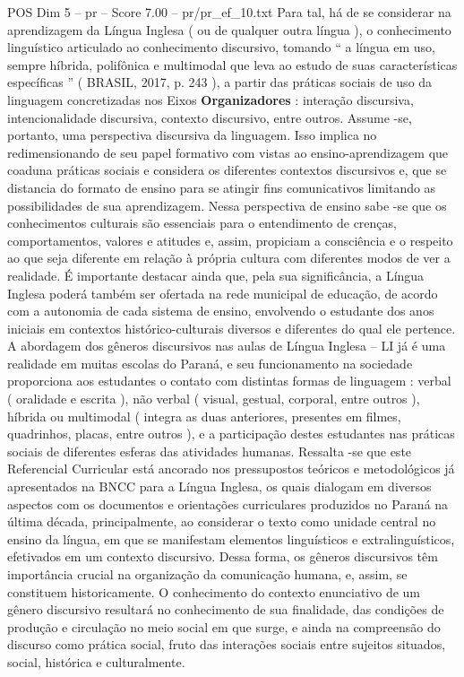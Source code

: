 \begin{textsample}{POS Dim 5 – pr – Score 7.00 – pr/pr\_ef\_10.txt}
Para tal, há de se considerar na aprendizagem da Língua Inglesa ( ou de qualquer outra língua ), o conhecimento linguístico articulado ao conhecimento discursivo, tomando “ a língua em uso, sempre híbrida, polifônica e multimodal que leva ao estudo de suas características específicas ” ( BRASIL, 2017, p. 243 ), a partir das práticas sociais de uso da linguagem concretizadas nos Eixos \textbf{Organizadores} : interação discursiva, intencionalidade discursiva, contexto discursivo, entre outros.
Assume -se, portanto, uma perspectiva discursiva da linguagem.
Isso implica no redimensionando de seu papel formativo com vistas ao ensino-aprendizagem que coaduna práticas sociais e considera os diferentes contextos discursivos e, que se distancia do formato de ensino para se atingir fins comunicativos limitando as possibilidades de sua aprendizagem.
Nessa perspectiva de ensino sabe -se que os conhecimentos culturais são essenciais para o entendimento de crenças, comportamentos, valores e atitudes e, assim, propiciam a consciência e o respeito ao que seja diferente em relação à própria cultura com diferentes modos de ver a realidade.
É importante destacar ainda que, pela sua significância, a Língua Inglesa poderá também ser ofertada na rede municipal de educação, de acordo com a autonomia de cada sistema de ensino, envolvendo o estudante dos anos iniciais em contextos histórico-culturais diversos e diferentes do qual ele pertence.
A abordagem dos gêneros discursivos nas aulas de Língua Inglesa – LI já é uma realidade em muitas escolas do Paraná, e seu funcionamento na sociedade proporciona aos estudantes o contato com distintas formas de linguagem : verbal ( oralidade e escrita ), não verbal ( visual, gestual, corporal, entre outros ), híbrida ou multimodal ( integra as duas anteriores, presentes em filmes, quadrinhos, placas, entre outros ), e a participação destes estudantes nas práticas sociais de diferentes esferas das atividades humanas.
Ressalta -se que este Referencial Curricular está ancorado nos pressupostos teóricos e metodológicos já apresentados na BNCC para a Língua Inglesa, os quais dialogam em diversos aspectos com os documentos e orientações curriculares produzidos no Paraná na última década, principalmente, ao considerar o texto como unidade central no ensino da língua, em que se manifestam elementos linguísticos e extralinguísticos, efetivados em um contexto discursivo.
Dessa forma, os gêneros discursivos têm importância crucial na organização da comunicação humana, e, assim, se constituem historicamente.
O conhecimento do contexto enunciativo de um gênero discursivo resultará no conhecimento de sua finalidade, das condições de produção e circulação no meio social em que surge, e ainda na compreensão do discurso como prática social, fruto das interações sociais entre sujeitos situados, social, histórica e culturalmente.

\end{textsample}
